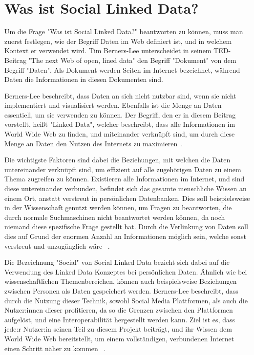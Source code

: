 \documentclass[acmtog]{acmart}
\begin{document}
\label{section:wasIstSocialLinkedData}
\section{Was ist Social Linked Data?}

Um die Frage "Was ist Social Linked Data?" beantworten zu können, muss man zuerst festlegen, wie der Begriff Daten im Web definiert ist, und in welchem Kontext er verwendet wird. Tim Berners-Lee unterscheidet in seinem TED-Beitrag "The next Web of open, lined data" den Begriff "Dokument" von dem Begriff "Daten". Als Dokument werden Seiten im Internet bezeichnet, während Daten die Informationen in diesen Dokumenten sind. 

Berners-Lee beschreibt, dass Daten an sich nicht nutzbar sind, wenn sie nicht implementiert und visualisiert werden. Ebenfalls ist die Menge an Daten essentiell, um sie verwenden zu können. Der Begriff, den er in diesem Beitrag vorstellt, heißt "Linked Data", welcher beschreibt, dass alle Informationen im World Wide Web zu finden, und miteinander verknüpft sind, um durch diese Menge an Daten den Nutzen des Internets zu maximieren~\cite{TED.2010}.

Die wichtigste Faktoren sind dabei die Beziehungen, mit welchen die Daten untereinander verknüpft sind, um effizient auf alle zugehörigen Daten zu einem Thema zugreifen zu können. Existieren alle Informationen im Internet, und sind diese untereinander verbunden, befindet sich das gesamte menschliche Wissen an einem Ort, anstatt verstreut in persönlichen Datenbanken. Dies soll beispielsweise in der Wissenschaft genutzt werden können, um Fragen zu beantworten, die durch normale Suchmaschinen nicht beantwortet werden können, da noch niemand diese spezifische Frage gestellt hat. Durch die Verlinkung von Daten soll dies auf Grund der enormen Anzahl an Informationen möglich sein, welche sonst verstreut und unzugänglich wäre ~\cite{TED.2010}.

Die Bezeichnung "Social" von Social Linked Data bezieht sich dabei auf die Verwendung des Linked Data Konzeptes bei persönlichen Daten. Ähnlich wie bei wissenschaftlichen Themenbereichen, können auch beispielsweise Beziehungen zwischen Personen als Daten gespeichert werden. Berners-Lee beschreibt, dass durch die Nutzung dieser Technik, sowohl Social Media Plattformen, als auch die Nutzer:innen dieser profitieren, da so die Grenzen zwischen den Plattformen aufgelöst, und eine Interoperabilität hergestellt werden kann. Ziel ist es, dass jede:r Nutzer:in seinen Teil zu diesem Projekt beiträgt, und ihr Wissen dem World Wide Web bereitstellt, um einem vollständigen, verbundenen Internet einen Schritt näher zu kommen  ~\cite{TED.2010}.
\end{document}
